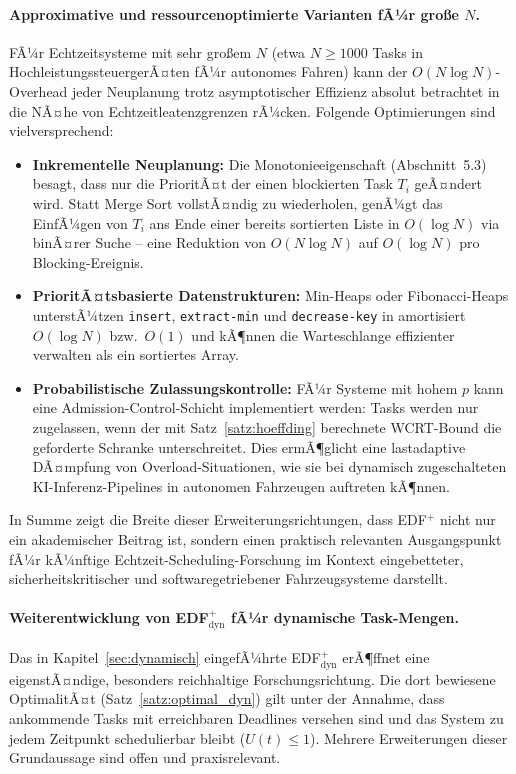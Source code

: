 ﻿\documentclass[a4paper,12pt]{article}
\theoremstyle{definition}
\begin{document}
	\paragraph{Approximative und ressourcenoptimierte Varianten fÃ¼r gro\ss{}e $N$.}
	FÃ¼r Echtzeitsysteme mit sehr gro\ss{}em $N$ (etwa $N \ge 1000$ Tasks in
	HochleistungssteuergerÃ¤ten fÃ¼r autonomes Fahren) kann der $O(N \log N)$-Overhead
	jeder Neuplanung trotz asymptotischer Effizienz absolut betrachtet in die NÃ¤he von
	Echtzeitleatenzgrenzen rÃ¼cken. Folgende Optimierungen sind vielversprechend:
	\begin{itemize}
		\item \textbf{Inkrementelle Neuplanung:} Die Monotonieeigenschaft
		      (Abschnitt~5.3) besagt, dass nur die PrioritÃ¤t der einen
		      blockierten Task $T_i$ geÃ¤ndert wird. Statt Merge Sort vollstÃ¤ndig zu
		      wiederholen, genÃ¼gt das EinfÃ¼gen von $T_i$ ans Ende einer bereits sortierten
		      Liste in $O(\log N)$ via binÃ¤rer Suche -- eine Reduktion von $O(N \log N)$
		      auf $O(\log N)$ pro Blocking-Ereignis.
		\item \textbf{PrioritÃ¤tsbasierte Datenstrukturen:} Min-Heaps oder
		      Fibonacci-Heaps unterstÃ¼t\-zen \texttt{insert}, \texttt{extract-min} und
		      \texttt{decrease-key} in amortisiert $O(\log N)$ bzw.\ $O(1)$ und kÃ¶nnen
		      die Warteschlange effizienter verwalten als ein sortiertes Array.
		\item \textbf{Probabilistische Zulassungskontrolle:} FÃ¼r Systeme mit
		      hohem $p$ kann eine Admission-Control-Schicht implementiert werden: Tasks
		      werden nur zugelassen, wenn der mit Satz~\ref{satz:hoeffding} berechnete
		      WCRT-Bound die geforderte Schranke unterschreitet. Dies ermÃ¶glicht eine
		      lastadaptive DÃ¤mpfung von Overload-Situationen, wie sie bei dynamisch
		      zugeschalteten KI-Inferenz-Pipelines in autonomen Fahrzeugen auftreten kÃ¶nnen.
	\end{itemize}
	In Summe zeigt die Breite dieser Erweiterungsrichtungen, dass EDF$^+$ nicht nur ein
	akademischer Beitrag ist, sondern einen praktisch relevanten Ausgangspunkt fÃ¼r
	kÃ¼nftige Echtzeit-Scheduling-Forschung im Kontext eingebetteter, sicherheitskritischer
	und softwaregetriebener Fahrzeugsysteme darstellt.

	\paragraph{Weiterentwicklung von EDF$^+_{\mathrm{dyn}}$ fÃ¼r dynamische Task-Mengen.}
	Das in Kapitel~\ref{sec:dynamisch} eingefÃ¼hrte EDF$^+_{\mathrm{dyn}}$ erÃ¶ffnet
	eine eigenstÃ¤ndige, besonders reichhaltige Forschungsrichtung. Die dort bewiesene
	OptimalitÃ¤t (Satz~\ref{satz:optimal_dyn}) gilt unter der Annahme, dass ankommende
	Tasks mit erreichbaren Deadlines versehen sind und das System zu jedem Zeitpunkt
	schedulierbar bleibt ($U(t) \le 1$). Mehrere Erweiterungen dieser Grundaussage sind
	offen und praxisrelevant.
\end{document}
